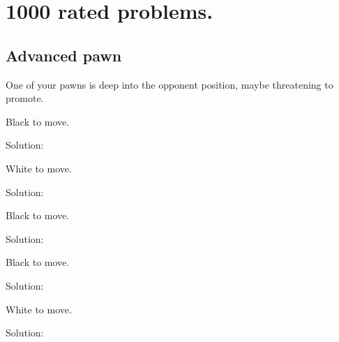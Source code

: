 \documentclass{book}
\begin{document}

 

\tableofcontents
\newpage

\chapter{1000 rated problems.}
\newpage 
\section{Advanced pawn}
One of your pawns is deep into the opponent position, maybe threatening to promote.\begin{multicols}{2} 
\begin{samepage} 
\newgame 


 
\showboard
 
 Black to move. 
 
Solution: 
 
\end{samepage}\begin{samepage} 
\newgame 


 
\showboard
 
 White to move. 
 
Solution: 
 
\end{samepage}\begin{samepage} 
\newgame 


 
\showboard
 
 Black to move. 
 
Solution: 
 
\end{samepage}\begin{samepage} 
\newgame 


 
\showboard
 
 Black to move. 
 
Solution: 
 
\end{samepage}\begin{samepage} 
\newgame 


 
\showboard
 
 White to move. 
 
Solution: 
 
\end{samepage}\end{multicols} 
\newpage 
\end{document}
